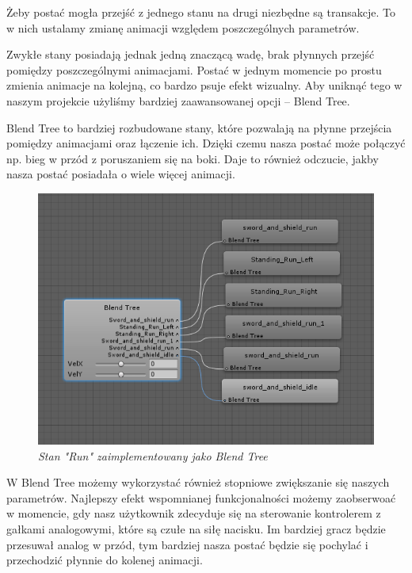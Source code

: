 \documentclass[openright]{xmgr}
\begin{document}
    Żeby postać mogła przejść z jednego stanu na drugi niezbędne są transakcje. To w nich ustalamy zmianę animacji względem poszczególnych parametrów. 

    Zwykłe stany posiadają jednak jedną znaczącą wadę, brak płynnych przejść pomiędzy poszczególnymi animacjami. Postać w jednym momencie po prostu zmienia animacje na kolejną, co bardzo psuje efekt wizualny. Aby uniknąć tego w naszym projekcie użyliśmy bardziej zaawansowanej opcji – Blend Tree.

    Blend Tree to bardziej rozbudowane stany, które pozwalają na płynne przejścia pomiędzy animacjami oraz łączenie ich. Dzięki czemu nasza postać może połączyć np. bieg w przód z poruszaniem się na boki. Daje to również odczucie, jakby nasza postać posiadała o wiele więcej animacji.
    \begin{figure}[H]
        \center
        \includegraphics[width=\textwidth]{blendtree_1.png}
        \caption{ \textit{Stan "Run"  zaimplementowany jako Blend Tree}}
        \end{figure}


    W Blend Tree możemy wykorzystać również stopniowe zwiększanie się naszych parametrów. Najlepszy efekt wspomnianej funkcjonalności możemy zaobserwoać w momencie, gdy nasz użytkownik zdecyduje się na sterowanie kontrolerem z gałkami analogowymi, które są czułe na siłę nacisku. Im bardziej gracz będzie przesuwał analog w przód, tym bardziej nasza postać będzie się pochylać i przechodzić płynnie do kolenej animacji.
\end{document}
